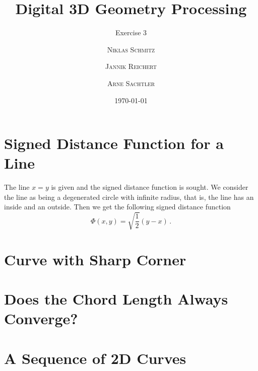 \documentclass{scrartcl}
\title{Digital 3D Geometry Processing}
\subtitle{Exercise 3}
\author{\textsc{Niklas Schmitz} \and \textsc{Jannik Reichert} \and \textsc{Arne Sachtler}}
\date{\today}
\begin{document}
\maketitle

\section{Signed Distance Function for a Line}
The line $x = y$ is given and the signed distance function is sought.
We consider the line as being a degenerated circle with infinite radius, that is, the line has an inside and an outside.
Then we get the following signed distance function
\begin{equation}
	\Phi (x,y) = \sqrt{\frac{1}{2}} (y - x) \, .
\end{equation}

\section{Curve with Sharp Corner}

\section{Does the Chord Length Always Converge?}

\section{A Sequence of 2D Curves}

	
\end{document}
